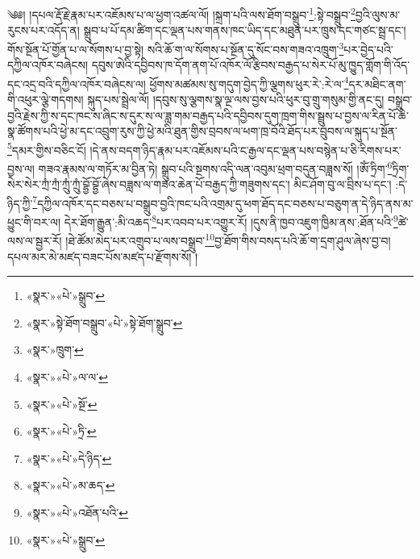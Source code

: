 ༄༅། །དཔལ་རྡོ་རྗེ་རྣམ་པར་འཇོམས་པ་ལ་ཕྱག་འཚལ་ལོ། །སྐྲག་པའི་ལས་ཐོག་བསྒྲུབ་\footnote{«སྣར་»«པེ་»སྒྲུབ་}:སྟེ་བསྒྲུབ་\footnote{«སྣར་»སྟེ་ཐོག་བསྒྲུབ་«པེ་»སྟེ་ཐོག་སྒྲུབ་}བྱའི་ལུས་མ་རུངས་པར་འདོད་ན། སྒྲུབ་པ་པོ་དམ་ཚིག་དང་ལྡན་པས་གནས་ཁང་ཡིད་དང་མཐུན་པར་ཁྲུས་དང་གཙང་སྦྲ་དང་། གོས་སྔོན་པོ་གྱོན་པ་ལ་སོགས་པ་བྱ་སྟེ། སའི་ཆོ་ག་ལ་སོགས་པ་སྔོན་དུ་སོང་བས་གཟའ་འཁྲུག་\footnote{«སྣར་»ཁྲུག་}པར་བྱེད་པའི་དཀྱིལ་འཁོར་བཞེངས། དབུས་ཨེའི་དབྱིབས་ཁ་དོག་ནག་པོ་འཁོར་ལོ་རྩིབས་བརྒྱད་པ་སེར་པོ་མུ་ཁྱུད་གློག་གི་འོད་དང་འདྲ་བའི་དཀྱིལ་འཁོར་བཞེངས་ལ། ཕྱོགས་མཚམས་སུ་གདུག་བྱེད་ཀྱི་ལྕགས་ཕུར་རེ་:རེ་ལ་\footnote{«སྣར་»«པེ་»ལ་ལ་}དར་མཐིང་ནག་གི་འཕུར་ལྕེ་གདགས། སྐུད་པས་སྦྲེལ་ལོ། །དབུས་སུ་ལྕགས་སྣ་ལྔ་ལས་བྱས་པའི་ཕུར་བུ་གྲུ་གསུམ་གྱི་ནང་དུ། བསྒྲུབ་བྱའི་རྗེས་ཀྱི་ས་དང་ཁང་ས་ཞིང་ས་དུར་ས་ལ་ཟླ་གམ་བརྒྱད་པའི་དབྱིབས་དུག་ཁྲག་གིས་སྦྲུས་པ་བྱས་ལ་རིན་པོ་ཆེ་སྣ་ཚོགས་པའི་ཕྱེ་མ་དང་འབྲུག་རུས་ཀྱི་ཕྱེ་མའི་ཐུན་གྱིས་བྲབས་ལ་ཕག་ཁྲ་བོའི་ཐོད་པར་བྲུབས་ལ་སྐུད་པ་སྔོན་\footnote{«སྣར་»«པེ་»སྔོ་}དམར་གྱིས་བཅིང་ངོ། །དེ་ནས་བདག་ཉིད་རྣམ་པར་འཇོམས་པའི་ང་རྒྱལ་དང་ལྡན་པས་བསྙེན་པ་ཅི་རིགས་པར་བྱས་ལ། གཟའ་རྣམས་ལ་གཏོར་མ་བྱིན་ཏེ། སྒྲུབ་པའི་སྔགས་འདི་ལན་འབུམ་ཕྲག་བདུན་བཟླས་སོ། །ཨོཾ་ཏྲིག་\footnote{«སྣར་»«པེ་»ཏྲི་}ཏྲིག་སེར་སེར་ཀྲཾ་ཀྲཾ་ཀྲུཾ་ཀྲུཾ་བྷྱོ་བྷྱོ་ཞེས་བཟླས་ལ་གཟའ་ཆེན་པོ་བརྒྱད་ཀྱི་གཟུགས་དང་། མིང་ཤོག་བུ་ལ་བྲིས་པ་དང་། :དེ་ཉིད་ཀྱི་\footnote{«སྣར་»«པེ་»དེ་ཉིད་}དཀྱིལ་འཁོར་དང་བཅས་པ་བསྒྲུབ་བྱའི་ཁང་པའི་འགྲམ་དུ་ཕག་ཐོད་དང་བཅས་པ་བཅུག་ན་དེ་ཉིད་ནས་མ་ཕྱུང་གི་བར་ལ། དེར་ཐོག་རྒྱུན་:མི་འཆད་\footnote{«སྣར་»«པེ་»མ་ཆད་}པར་འབབ་པར་འགྱུར་རོ། །དུས་ནི་ཁྱབ་འཇུག་ཁྱིམ་ནས་:ཐོན་པའི་\footnote{«སྣར་»«པེ་»འཐོན་པའི་}ཚེ་ལས་ལ་སྦྱར་རོ། །ཐེ་ཚོམ་མེད་པར་འགྲུབ་པ་ལས་བསྒྲུབ་\footnote{«སྣར་»«པེ་»སྒྲུབ་}བྱ་ཐོག་གིས་བསད་པའི་ཆོ་ག་དྲག་ཤུལ་ཞེས་བྱ་བ། དཔལ་མར་མེ་མཛད་བཟང་པོས་མཛད་པ་རྫོགས་སོ། ། 